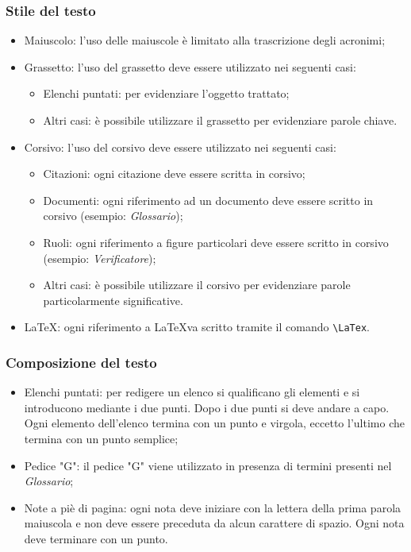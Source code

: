 \subsubsection{Stile del testo}
\begin{itemize}
	\item Maiuscolo: l'uso delle maiuscole è limitato alla trascrizione degli acronimi;
	\item Grassetto: l'uso del grassetto deve essere utilizzato nei seguenti casi: 
	\begin{itemize}
		\item Elenchi puntati: per evidenziare l'oggetto trattato;
		\item Altri casi: è possibile utilizzare il grassetto per evidenziare parole chiave.
	\end{itemize}
	\item Corsivo: l'uso del corsivo deve essere utilizzato nei seguenti casi:
	\begin{itemize}
		\item Citazioni: ogni citazione deve essere scritta in corsivo; 
		\item Documenti: ogni riferimento ad un documento deve essere scritto in corsivo (esempio: \textit{Glossario});
		\item Ruoli: ogni riferimento a figure particolari deve essere scritto in corsivo (esempio: \textit{Verificatore});
		\item Altri casi: è possibile utilizzare il corsivo per evidenziare parole particolarmente significative.
	\end{itemize}
	\item \LaTeX: ogni riferimento a \LaTeX va scritto tramite il comando \verb|\LaTex|.
\end{itemize}

\subsubsection{Composizione del testo}
\begin{itemize}
	\item Elenchi puntati: per redigere un elenco si qualificano gli elementi e si introducono mediante
	i due punti. Dopo i due punti si deve andare a capo. Ogni elemento dell'elenco termina con un punto e virgola, eccetto l'ultimo che termina con un punto semplice;
	\item Pedice "G": il pedice "G" viene utilizzato in presenza di termini presenti nel \textit{Glossario};
	\item Note a piè di pagina: ogni nota deve iniziare con la lettera della prima parola maiuscola e non deve essere preceduta da alcun carattere di spazio. Ogni nota deve terminare con un punto.
\end{itemize}

